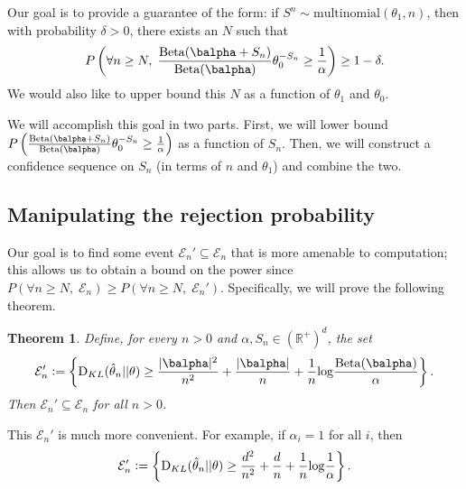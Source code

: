 \documentclass[11pt]{article}
\def\log{{\rm log}}
\newcommand{\Reals}{\mathbb R}
\newcommand{\Beta}{\mathrm{Beta}}
\newcommand{\KL}{\mathrm{D}_{KL}}
\newtheorem{thm}{Theorem}[section]
\newcommand{\df}{\vcentcolon=}
\begin{document}
Our goal is to provide a guarantee of the form: if $S^n\sim\mathrm{multinomial}(\theta_1,n)$, then with probability $\delta>0$, there exists an $N$ such that 
\begin{equation*}
  P \left(\forall n \geq N,\;
      \frac{\Beta(\balpha + S_n)}
  {\Beta(\balpha)}
  \theta_0 ^{-S_n} \geq \frac{1}{\alpha}
  \right) \geq 1-\delta.
\end{equation*}
We would also like to upper bound this $N$ as a function of $\theta_1$ and $\theta_0$.

We will accomplish this goal in two parts. First, we will lower bound 
$
  P \left(
      \frac{\Beta(\balpha + S_n)}
  {\Beta(\balpha)}
  \theta_0 ^{-S_n} \geq \frac{1}{\alpha}
  \right) 
$
as a function of $S_n$. Then, we will construct a confidence sequence on $S_n$ (in terms of $n$ and $\theta_1$) and combine the two.

\subsection{Manipulating the rejection probability}
Our goal is to find some event $\mathcal E_n'\subseteq \mathcal E_n$ that is more amenable to computation; this allows us to obtain a bound on the power since
$P(\forall n \geq N,\; \mathcal E_n) \geq P(\forall n \geq N,\; \mathcal E_n')$.  Specifically, we will prove the following theorem.
\begin{thm}\label{thm:calEprime}
Define, for every $n>0$ and $\alpha, S_n\in(\Reals^+)^d$, the set
\begin{equation}
  \label{eq:decision_boundary}
  \mathcal E_n'\df
  \left\{
    \KL(\hat\theta_n|| \theta)
    \geq
      \frac{|\balpha|^2}{n^2} + \frac{|\balpha|}{n}
    +\frac{1}{n}\log\frac{\Beta(\balpha)}{\alpha}
  \right\}.
\end{equation}
Then $\mathcal E_n' \subseteq \mathcal E_n$ for all $n>0$. 
\end{thm}
This $\mathcal E_n'$ is much more convenient. For example, if $\alpha_i = 1$ for all $i$, then 
\begin{equation*}
  \mathcal E_n'\df
  \left\{
    \KL(\hat\theta_n|| \theta)
    \geq
    \frac{d^2}{n^2}
    +\frac{d}{n}
    +\frac{1}{n}\log\frac{1}{\alpha}
  \right\}.
\end{equation*}
\end{document}
